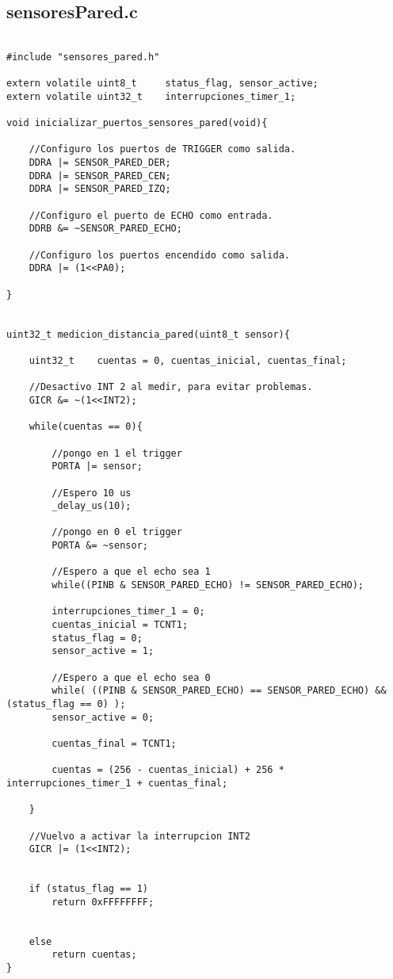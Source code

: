 \documentclass[a4paper,12pt]{article}   %
\begin{document}
\subsection{sensoresPared.c}
\begin{lstlisting}

#include "sensores_pared.h"

extern volatile uint8_t     status_flag, sensor_active;
extern volatile uint32_t    interrupciones_timer_1;

void inicializar_puertos_sensores_pared(void){

	//Configuro los puertos de TRIGGER como salida.
	DDRA |= SENSOR_PARED_DER;
	DDRA |= SENSOR_PARED_CEN;
	DDRA |= SENSOR_PARED_IZQ;

	//Configuro el puerto de ECHO como entrada.
	DDRB &= ~SENSOR_PARED_ECHO;

	//Configuro los puertos encendido como salida.
	DDRA |= (1<<PA0);

}


uint32_t medicion_distancia_pared(uint8_t sensor){

    uint32_t    cuentas = 0, cuentas_inicial, cuentas_final;

    //Desactivo INT 2 al medir, para evitar problemas.
    GICR &= ~(1<<INT2);

    while(cuentas == 0){

        //pongo en 1 el trigger
        PORTA |= sensor;

        //Espero 10 us
        _delay_us(10);

        //pongo en 0 el trigger
        PORTA &= ~sensor;

        //Espero a que el echo sea 1
        while((PINB & SENSOR_PARED_ECHO) != SENSOR_PARED_ECHO);

        interrupciones_timer_1 = 0;
        cuentas_inicial = TCNT1;
        status_flag = 0;
        sensor_active = 1;

        //Espero a que el echo sea 0
        while( ((PINB & SENSOR_PARED_ECHO) == SENSOR_PARED_ECHO) && (status_flag == 0) );
        sensor_active = 0;

        cuentas_final = TCNT1;

        cuentas = (256 - cuentas_inicial) + 256 * interrupciones_timer_1 + cuentas_final;

    }

    //Vuelvo a activar la interrupcion INT2
    GICR |= (1<<INT2);


    if (status_flag == 1)
        return 0xFFFFFFFF;


    else
        return cuentas;
}
\end{lstlisting}
\end{document}
